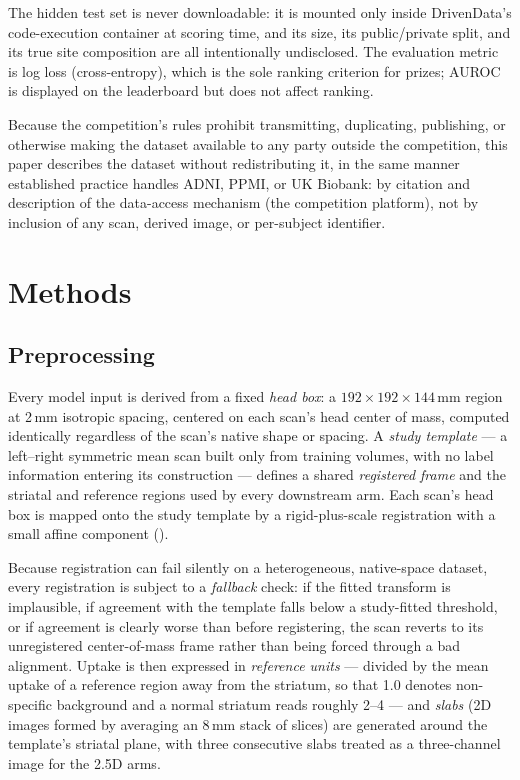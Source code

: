 \documentclass[10pt]{article}
\begin{document}
The hidden test set is never downloadable: it is mounted only inside DrivenData's code-execution container at scoring time, and its size, its public/private split, and its true site composition are all intentionally undisclosed. The evaluation metric is log loss (cross-entropy), which is the sole ranking criterion for prizes; AUROC is displayed on the leaderboard but does not affect ranking.

Because the competition's rules prohibit transmitting, duplicating, publishing, or otherwise making the dataset available to any party outside the competition, this paper describes the dataset without redistributing it, in the same manner established practice handles ADNI, PPMI, or UK Biobank: by citation and description of the data-access mechanism (the competition platform), not by inclusion of any scan, derived image, or per-subject identifier.

\section{Methods}
\label{sec:methods}

\subsection{Preprocessing}
\label{sec:preprocessing}

Every model input is derived from a fixed \emph{head box}: a $192\times192\times144$\,mm region at 2\,mm isotropic spacing, centered on each scan's head center of mass, computed identically regardless of the scan's native shape or spacing. A \emph{study template} --- a left--right symmetric mean scan built only from training volumes, with no label information entering its construction --- defines a shared \emph{registered frame} and the striatal and reference regions used by every downstream arm. Each scan's head box is mapped onto the study template by a rigid-plus-scale registration with a small affine component ().

Because registration can fail silently on a heterogeneous, native-space dataset, every registration is subject to a \emph{fallback} check: if the fitted transform is implausible, if agreement with the template falls below a study-fitted threshold, or if agreement is clearly worse than before registering, the scan reverts to its unregistered center-of-mass frame rather than being forced through a bad alignment. Uptake is then expressed in \emph{reference units} --- divided by the mean uptake of a reference region away from the striatum, so that 1.0 denotes non-specific background and a normal striatum reads roughly 2--4 --- and \emph{slabs} (2D images formed by averaging an 8\,mm stack of slices) are generated around the template's striatal plane, with three consecutive slabs treated as a three-channel image for the 2.5D arms.
\end{document}
